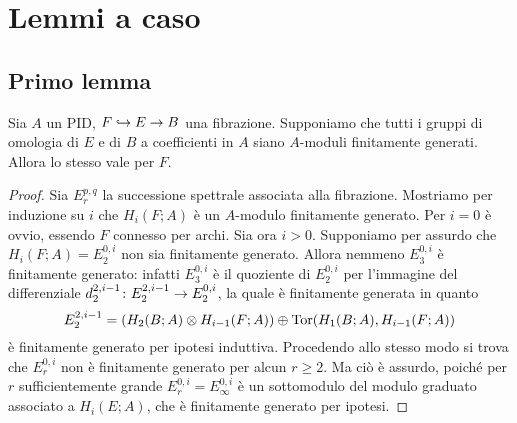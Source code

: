 \chapter{Lemmi a caso}


\section{Primo lemma}
\begin{proposition}
Sia $A$ un PID, $F\hookrightarrow E\to B$ una fibrazione. Supponiamo che tutti i gruppi di omologia di $E$ e di $B$ a coefficienti in $A$ siano $A$-moduli finitamente generati. Allora lo stesso vale per $F$.
\end{proposition}
\begin{proof}
Sia $E^{p,q}_r$ la successione spettrale associata alla fibrazione. Mostriamo per induzione su $i$ che $H_i(F;A)$ è un $A$-modulo finitamente generato. Per $i=0$ è ovvio, essendo $F$ connesso per archi. Sia ora $i>0$. Supponiamo per assurdo che $H_i(F;A)=E^{0,i}_2$ non sia finitamente generato. Allora nemmeno $E^{0,i}_3$ è finitamente generato: infatti $E^{0,i}_3$ è il quoziente di $E^{0,i}_2$ per l'immagine del differenziale $d^{2,i-1}_2\colon E^{2,i-1}_2\to E^{0,i}_2$, la quale è finitamente generata in quanto
$$
E^{2,i-1}_2=(H_2(B;A)\mathbin{\otimes} H_{i-1}(F;A))\mathbin{\oplus}\operatorname{Tor}(H_1(B;A),H_{i-1}(F;A))
$$
è finitamente generato per ipotesi induttiva. Procedendo allo stesso modo si trova che $E^{0,i}_r$ non è finitamente generato per alcun $r\ge 2$. Ma ciò è assurdo, poiché per $r$ sufficientemente grande $E^{0,i}_r=E^{0,i}_\infty$ è un sottomodulo del modulo graduato associato a $H_i(E;A)$, che è finitamente generato per ipotesi.
\end{proof}